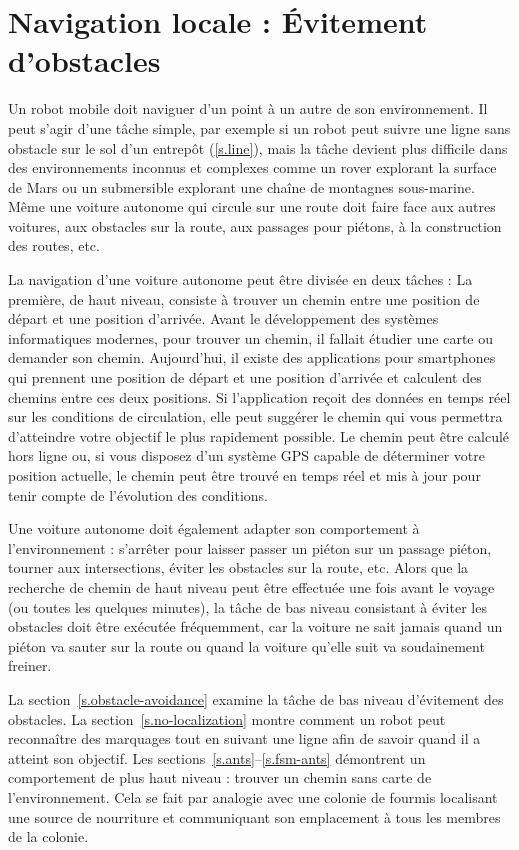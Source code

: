 
\chapter{Navigation locale : Évitement d'obstacles}\label{ch.obstacle}

Un robot mobile doit naviguer d'un point à un autre de son environnement. Il peut s'agir d'une tâche simple, par exemple si un robot peut suivre une ligne sans obstacle sur le sol d'un entrepôt (\ref{s.line}), mais la tâche devient plus difficile dans des environnements inconnus et complexes comme un rover explorant la surface de Mars ou un submersible explorant une chaîne de montagnes sous-marine. Même une voiture autonome qui circule sur une route doit faire face aux autres voitures, aux obstacles sur la route, aux passages pour piétons, à la construction des routes, etc. 

La navigation d'une voiture autonome peut être divisée en deux tâches : La première, de haut niveau, consiste à trouver un chemin entre une position de départ et une position d'arrivée. Avant le développement des systèmes informatiques modernes, pour trouver un chemin, il fallait étudier une carte ou demander son chemin. Aujourd'hui, il existe des applications pour smartphones qui prennent une position de départ et une position d'arrivée et calculent des chemins entre ces deux positions. Si l'application reçoit des données en temps réel sur les conditions de circulation, elle peut suggérer le chemin qui vous permettra d'atteindre votre objectif le plus rapidement possible. Le chemin peut être calculé hors ligne ou, si vous disposez d'un système GPS capable de déterminer votre position actuelle, le chemin peut être trouvé en temps réel et mis à jour pour tenir compte de l'évolution des conditions.

Une voiture autonome doit également adapter son comportement à l'environnement : s'arrêter pour laisser passer un piéton sur un passage piéton, tourner aux intersections, éviter les obstacles sur la route, etc. Alors que la recherche de chemin de haut niveau peut être effectuée une fois avant le voyage (ou toutes les quelques minutes), la tâche de bas niveau consistant à éviter les obstacles doit être exécutée fréquemment, car la voiture ne sait jamais quand un piéton va sauter sur la route ou quand la voiture qu'elle suit va soudainement freiner.

La section~\ref{s.obstacle-avoidance} examine la tâche de bas niveau d'évitement des obstacles. La section~\ref{s.no-localization} montre comment un robot peut reconnaître des marquages tout en suivant une ligne afin de savoir quand il a atteint son objectif. Les sections~\ref{s.ants}--\ref{s.fsm-ants} démontrent un comportement de plus haut niveau : trouver un chemin sans carte de l'environnement. Cela se fait par analogie avec une colonie de fourmis localisant une source de nourriture et communiquant son emplacement à tous les membres de la colonie.

